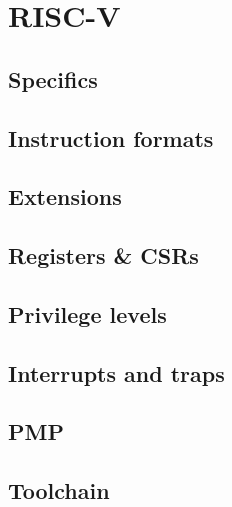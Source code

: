 \chapter{RISC-V}
\label{cha:riscv}

\lipsum[1]

\section{Specifics}
\label{cha:riscv_specifics}

\lipsum[1]

\section{Instruction formats}
\label{cha:riscv_Instruction-formats}

\lipsum[1]

\section{Extensions}
\label{cha:riscv_Extensions}

\lipsum[1]

\section{Registers \& CSRs}
\label{cha:riscv_Registers-CSRs}

\lipsum[1]

\section{Privilege levels}
\label{cha:riscv_Privilege-levels}

\lipsum[1]

\section{Interrupts and traps}
\label{cha:riscv_Interrupts-and-traps}

\lipsum[1]

\section{PMP}
\label{cha:riscv_PMP}

\lipsum[1]

\section{Toolchain}
\label{cha:riscv_Toolchain}

\lipsum[1]
